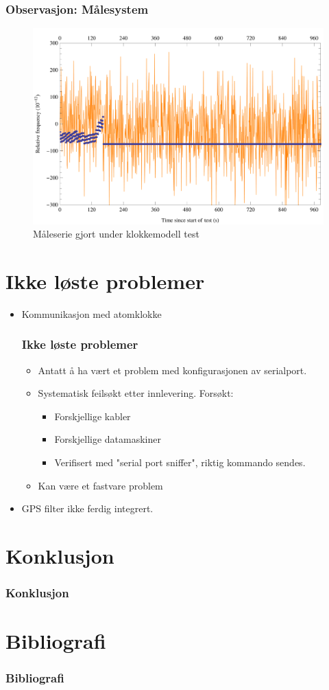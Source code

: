 \documentclass[xcolor=table]{beamer}
\begin{document}
\begin{frame}
\frametitle{Observasjon: Målesystem}
      \begin{figure}
        \includegraphics[scale=0.70]{thesis/graphics/20161024-test2-telemetry-and-cnt91-combined-1-2.png}
        \caption{Måleserie gjort under klokkemodell test}
      \end{figure}
\end{frame}

\section{Ikke løste problemer}
\begin{frame}
  \begin{itemize}
  \item Kommunikasjon med atomklokke
    \frametitle{Ikke løste problemer}
    \begin{itemize}
      \item Antatt å ha vært et problem med konfigurasjonen av serialport.
      \item Systematisk feilsøkt etter innlevering. Forsøkt:
      \begin{itemize}
        \item Forskjellige kabler
        \item Forskjellige datamaskiner
        \item Verifisert med "serial port sniffer", riktig kommando sendes.
      \end{itemize}
      \item Kan være et fastvare problem
    \end{itemize}
  \item GPS filter ikke ferdig integrert.
  \end{itemize}
\end{frame}

\section{Konklusjon}
\begin{frame}
  \frametitle{Konklusjon}
\end{frame}

\section{Bibliografi}
\begin{frame}[allowframebreaks]%
  \frametitle{Bibliografi}
  \printbibliography[heading=bibintoc]
\end{frame}
\end{document}
